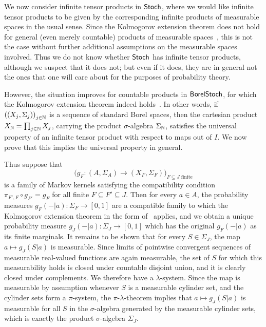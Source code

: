 \documentclass[11pt]{article}
\begin{document}
\begin{example}

	\label{infprods_stoch}
	We now consider infinite tensor products in $\operatorname{\mathsf{Stoch}}$, where we would like infinite tensor products to be given by the corresponding infinite products of measurable spaces in the usual sense. Since the Kolmogorov extension theorem does not hold for general (even merely countable) products of measurable spaces~\cite{AJ}, this is not the case without further additional assumptions on the measurable spaces involved. Thus we do not know whether $\operatorname{\mathsf{Stoch}}$ has infinite tensor products, although we suspect that it does not; but even if it does, they are in general not the ones that one will care about for the purposes of probability theory.

	However, the situation improves for countable products in $\operatorname{\mathsf{BorelStoch}}$, for which the Kolmogorov extension theorem indeed holds~\cite[Theorem~14.35]{klenke}. In other words, if $\left( (X_j, \Sigma_j) \right)_{j \in \mathbb{N}}$ is a sequence of standard Borel spaces, then the cartesian product $X_{\mathbb{N}} = \prod_{j \in \mathbb{N}} X_j$, carrying the product $\sigma$-algebra $\Sigma_{\mathbb{N}}$, satisfies the universal property of an infinite tensor product with respect to maps out of $I$. We now prove that this implies the universal property in general.

	Thus suppose that
	\[
		\Big( g_F : (A,\Sigma_A) \longrightarrow (X_F, \Sigma_F) \Big)_{F \subseteq J \text{ finite}}
	\]
	is a family of Markov kernels satisfying the compatibility condition $\pi_{F',F} \circ g_{F'} = g_F$ for all finite $F \subseteq F' \subseteq J$. Then for every $a \in A$, the probability measures $g_F(-|a) : \Sigma_F \to [0,1]$ are a compatible family to which the Kolmogorov extension theorem in the form of~\cite[Theorem~14.35]{klenke} applies, and we obtain a unique probability measure $g_J(-|a) : \Sigma_J \to [0,1]$ which has the original $g_F(-|a)$ as its finite marginals. It remains to be shown that for every $S \in \Sigma_J$, the map $a \mapsto g_J(S|a)$ is measurable. Since limits of pointwise convergent sequences of measurable real-valued functions are again measurable, the set of $S$ for which this measurability holds is closed under countable disjoint union, and it is clearly closed under complements. We therefore have a $\lambda$-system. Since the map is measurable by assumption whenever $S$ is a measurable cylinder set, and the cylinder sets form a $\pi$-system, the $\pi$-$\lambda$-theorem implies that $a \mapsto g_J(S|a)$ is measurable for all $S$ in the $\sigma$-algebra generated by the measurable cylinder sets, which is exactly the product $\sigma$-algebra $\Sigma_J$.


\end{example}
\end{document}
